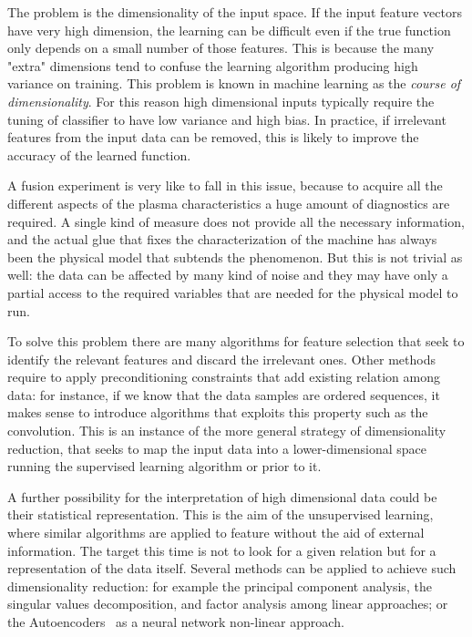 %
The problem is the dimensionality of the input space. If the input feature vectors have very high dimension, the learning can be difficult even if the true function only depends on a small number of those features.  This is because the many "extra" dimensions tend to confuse the learning algorithm producing high variance on training. 
This problem is known in machine learning as the \textit{course of dimensionality}.
For this reason high dimensional inputs typically require the tuning of classifier to have low variance and high bias. In practice, if irrelevant features from the input data can be removed, this is likely to improve the accuracy of the learned function. 

A fusion experiment is very like to fall in this issue, because to acquire all the different aspects of the plasma characteristics a huge amount of diagnostics are required. A single kind of measure does not provide all the necessary information, and the actual glue that fixes the characterization of the machine has always been the physical model that subtends the phenomenon.
But this is not trivial as well: the data can be affected by many kind of noise and they may have only a partial access to the required variables that are needed for the physical model to run.

To solve this problem there are many algorithms for feature selection that seek to identify the relevant features and discard the irrelevant ones. 
Other methods require to apply preconditioning constraints that add existing relation among data: for instance, if we know that the data samples are ordered sequences, it makes sense to introduce algorithms that exploits this property such as the convolution.
This is an instance of the more general strategy of dimensionality reduction, that seeks to map the input data into a lower-dimensional space running the supervised learning algorithm or prior to it. 

A further possibility for the interpretation of high dimensional data could be their statistical representation.
This is the aim of the unsupervised learning, where similar algorithms are applied to feature without the aid of external information. The target this time is not to look for a given relation but for a representation of the data itself.
Several methods can be applied to achieve such dimensionality reduction: for example the principal component analysis, the singular values decomposition, and factor analysis among linear approaches; or the Autoencoders~\cite{Hinton504} as a neural network non-linear approach.

